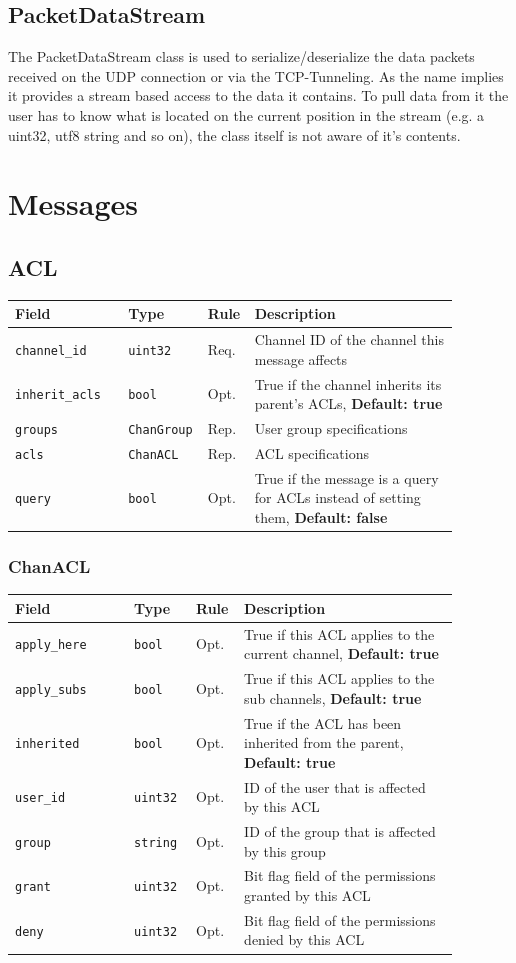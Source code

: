 \documentclass[11pt]{article} %
\newenvironment{mumbleMessageEx}
{%
	\small
	\renewcommand\arraystretch{1.5}
	\begin{tabular}{p{0.25\linewidth}p{0.13\linewidth}p{0.05\linewidth}p{0.45\linewidth}}
	Field & Type & Rule & Description \\
	\hline
}
{%
	\end{tabular}
	\renewcommand\arraystretch{1.0}
}
\newcommand{\mumbleMessageExItem}[4]{ \texttt{#1} & \texttt{#2} & #3 & #4 \\ }
\begin{document}
\subsection {PacketDataStream}
The PacketDataStream class is used to serialize/deserialize the data packets received on the UDP connection or via the TCP-Tunneling. As the name implies it provides a stream based access to the data it contains. To pull data from it the user has to know what is located on the current position in the stream (e.g. a uint32, utf8 string and so on), the class itself is not aware of it's contents.

\section{Messages}

\subsection{ACL}
\label{msg:acl}

\begin{mumbleMessageEx}
\mumbleMessageExItem{channel\_id}{uint32}{Req.}{Channel ID of the channel this message affects}
\mumbleMessageExItem{inherit\_acls}{bool}{Opt.}{True if the channel inherits its parent's ACLs, \textbf{Default: true}}
\mumbleMessageExItem{groups}{ChanGroup}{Rep.}{User group specifications}
\mumbleMessageExItem{acls}{ChanACL}{Rep.}{ACL specifications}
\mumbleMessageExItem{query}{bool}{Opt.}{True if the message is a query for ACLs instead of setting them, \textbf{Default: false}}
\end{mumbleMessageEx}

\subsubsection{ChanACL}
\label{msg:chanACL}

\begin{mumbleMessageEx}
\mumbleMessageExItem{apply\_here}{bool}{Opt.}{True if this ACL applies to the current channel, \textbf{Default: true}}
\mumbleMessageExItem{apply\_subs}{bool}{Opt.}{True if this ACL applies to the sub channels, \textbf{Default: true}}
\mumbleMessageExItem{inherited}{bool}{Opt.}{True if the ACL has been inherited from the parent, \textbf{Default: true}}
\mumbleMessageExItem{user\_id}{uint32}{Opt.}{ID of the user that is affected by this ACL}
\mumbleMessageExItem{group}{string}{Opt.}{ID of the group that is affected by this group}
\mumbleMessageExItem{grant}{uint32}{Opt.}{Bit flag field of the permissions granted by this ACL}
\mumbleMessageExItem{deny}{uint32}{Opt.}{Bit flag field of the permissions denied by this ACL}
\end{mumbleMessageEx}
\end{document}
